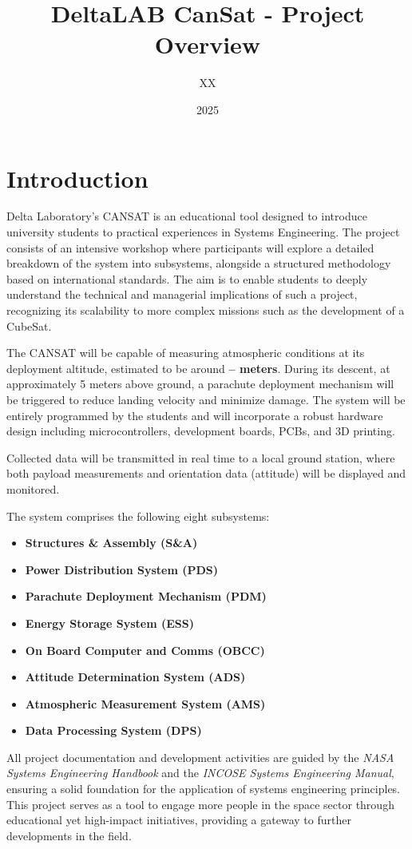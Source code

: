 \documentclass{article}
\title{DeltaLAB CanSat - Project Overview}
\author{XX}
\date{2025}
\begin{document}
\maketitle

\section{Introduction}
Delta Laboratory's CANSAT is an educational tool designed to introduce university students to practical experiences in Systems Engineering. The project consists of an intensive workshop where participants will explore a detailed breakdown of the system into subsystems, alongside a structured methodology based on international standards. The aim is to enable students to deeply understand the technical and managerial implications of such a project, recognizing its scalability to more complex missions such as the development of a CubeSat.

The CANSAT will be capable of measuring atmospheric conditions at its deployment altitude, estimated to be around \textbf{-- meters}. During its descent, at approximately 5 meters above ground, a parachute deployment mechanism will be triggered to reduce landing velocity and minimize damage. The system will be entirely programmed by the students and will incorporate a robust hardware design including microcontrollers, development boards, PCBs, and 3D printing.

Collected data will be transmitted in real time to a local ground station, where both payload measurements and orientation data (attitude) will be displayed and monitored.

The system comprises the following eight subsystems:

\begin{itemize}
    \item \textbf{Structures \& Assembly (S\&A)}
    \item \textbf{Power Distribution System (PDS)}
    \item \textbf{Parachute Deployment Mechanism (PDM)}
    \item \textbf{Energy Storage System (ESS)}
    \item \textbf{On Board Computer and Comms (OBCC)}
    \item \textbf{Attitude Determination System (ADS)}
    \item \textbf{Atmospheric Measurement System (AMS)}
    \item \textbf{Data Processing System (DPS)}
\end{itemize}

All project documentation and development activities are guided by the \textit{NASA Systems Engineering Handbook} and the \textit{INCOSE Systems Engineering Manual}, ensuring a solid foundation for the application of systems engineering principles. This project serves as a tool to engage more people in the space sector through educational yet high-impact initiatives, providing a gateway to further developments in the field.
\end{document}
